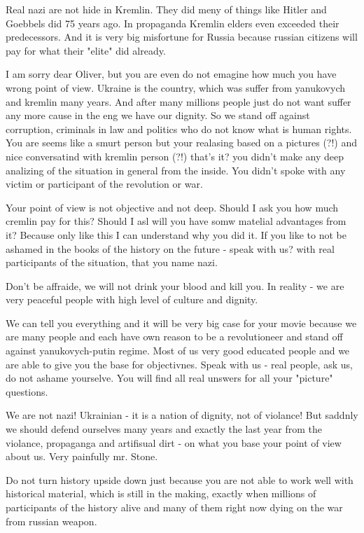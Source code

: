 \begin{itemize}
\begin{itemize}
Real nazi are not hide in Kremlin. They did meny of things like Hitler and
Goebbels did 75 years ago. In propaganda Kremlin elders even exceeded their
predecessors. And it is very big misfortune for Russia because russian citizens
will pay for what their "elite" did already.

\end{itemize} %


I am sorry dear Oliver, but you are even do not emagine how much you have wrong
point of view. Ukraine is the country, which was suffer from yanukovych and
kremlin many years. And after many millions people just do not want suffer any
more cause in the eng we have our dignity. So we stand off against corruption,
criminals in law and politics who do not know what is human rights. You are
seems like a smurt person but your realasing based on a pictures (?!) and nice
conversatind with kremlin person (?!) that's it? you didn't make any deep
analizing of the situation in general from the inside. You didn't spoke with
any victim or participant of the revolution or war. 

Your point of view is not objective and not deep. Should I ask you how much
cremlin pay for this? Should I asl will you have somw matelial advantages from
it? Because only like this I can understand why you did it. If you like to not
be ashamed in the books of the history on the future - speak with us? with real
participants of the situation, that you name nazi. 

Don't be affraide, we will not drink your blood and kill you. In reality - we
are very peaceful people with high level of culture and dignity. 

We can tell you everything and it will be very big case for your movie because
we are many people and each have own reason to be a revolutioneer and stand off
against yanukovych-putin regime. Most of us very good educated people and we
are able to give you the base for objectivnes.  Speak with us - real people,
ask us, do not ashame yourselve. You will find all real unswers for all your
"picture" questions. 

We are not nazi! Ukrainian - it is a nation of dignity, not of violance! But
saddnly we should defend ourselves many years and exactly the last year from
the violance, propaganga and artifisual dirt - on what you base your point of
view about us. Very painfully mr. Stone. 

Do not turn history upside down just because you are not able to work well with
historical material, which is still in the making, exactly when millions of
participants of the history alive and many of them right now dying on the war
from russian weapon.


\end{itemize}
